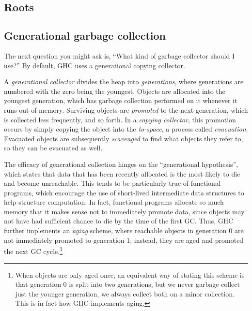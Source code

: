 \subsection{Roots}


\subsection{Generational garbage collection}

The next question you might ask is, ``What kind of garbage collector
should I use?''  By default, GHC uses a generational copying collector.

A \emph{generational collector} divides the heap into
\emph{generations}, where generations are numbered with the zero being
the youngest.  Objects are allocated into the youngest generation, which
has garbage collection performed on it whenever it runs out of memory.
Surviving objects are \emph{promoted} to the next generation, which is
collected less frequently, and so forth.  In a \emph{copying collector}, this
promotion occurs by simply copying the object into the \emph{to-space},
a process called \emph{evacuation}.  Evacuated objects are subsequently
\emph{scavenged} to find what objects they refer to, so they can be evacuated as well.


The efficacy of generational collection hinges on the ``generational
hypothesis'', which states that data that has been recently allocated is
the most likely to die and become unreachable.  This tends to be
particularly true of functional programs, which encourage the use of short-lived
intermediate data structures to help structure computation.  In fact,
functional programs allocate so much memory that it makes sense not to
immediately promote data, since objects may not have had sufficient
chance to die by the time of the first GC.  Thus, GHC further implements
an \emph{aging} scheme, where reachable objects in generation 0 are not
immediately promoted to generation 1; instead, they are aged and
promoted the next GC cycle.\footnote{When objects are only aged once, an
equivalent way of stating this scheme is that generation 0 is split into
two generations, but we never garbage collect just the younger
generation, we always collect both on a minor collection.  This is in fact
how GHC implements aging.}

